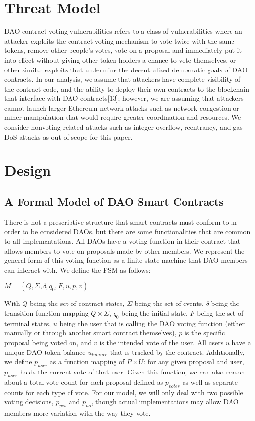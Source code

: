 \documentclass[conference]{IEEEtran}
\begin{document}
\section{Threat Model}
DAO contract voting vulnerabilities refers to a class of vulnerabilities where an attacker exploits the contract voting mechanism to vote twice with the same tokens, remove other people's votes, vote on a proposal and immediately put it into effect without giving other token holders a chance to vote themselves, or other similar exploits that undermine the decentralized democratic goals of DAO contracts. In our analysis, we assume that attackers have complete visibility of the contract code, and the ability to deploy their own contracts to the blockchain that interface with DAO contracts[13]; however, we are assuming that attackers cannot launch larger Ethereum network attacks such as network congestion or miner manipulation that would require greater coordination and resources. We consider nonvoting-related attacks such as integer overflow, reentrancy, and gas DoS attacks as out of scope for this paper. 

\section{Design}

\subsection{A Formal Model of DAO Smart Contracts}
There is not a prescriptive structure that smart contracts must conform to in order to be considered DAOs, but there are some functionalities that are common to all implementations. All DAOs have a voting function in their contract that allows members to vote on proposals made by other members. We represent the general form of this voting function as a finite state machine that DAO members can interact with. We define the FSM as follows:
\begin{center}
$M = (Q, \Sigma, \delta, q_0, F, u, p, v)$
\end{center}

With $Q$ being the set of contract states, $\Sigma$ being the set of events, $\delta$ being the transition function mapping $Q\times\Sigma$, $q_0$ being the initial state, $F$ being the set of terminal states, $u$ being the user that is calling the DAO voting function (either manually or through another smart contract themselves), $p$ is the specific proposal being voted on, and $v$ is the intended vote of the user. All users $u$ have a unique DAO token balance $u_{balance}$ that is tracked by the contract. Additionally, we define $p_{user}$ as a function mapping of $P\times U$: for any given proposal and user, $p_{user}$ holds the current vote of that user. Given this function, we can also reason about a total vote count for each proposal defined as $p_{votes}$ as well as separate counts for each type of vote. For our model, we will only deal with two possible voting decisions, $p_{yes}$ and $p_{no}$, though actual implementations may allow DAO members more variation with the way they vote.
\end{document}
